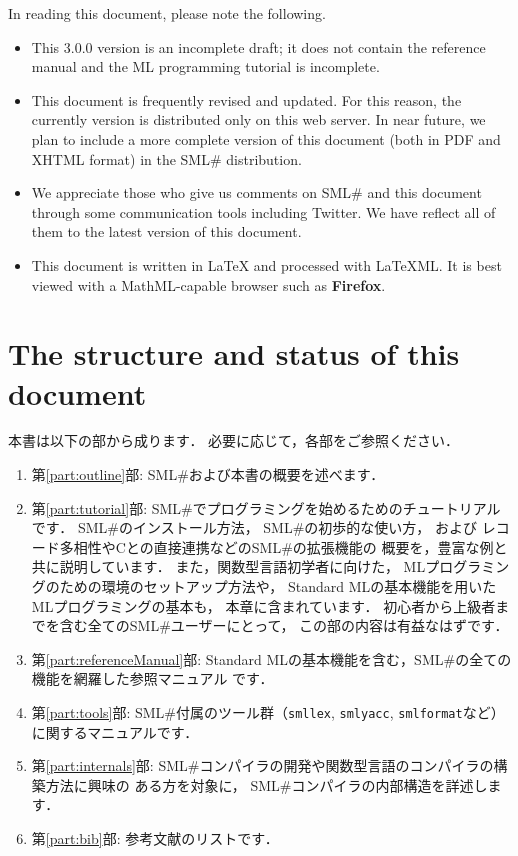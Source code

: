 \documentclass{jbook}
\newcommand{\txt}[2]{#2}
\newcommand{\smlsharp}{SML\#}
\newcommand{\version}{3.0.0}
\begin{document}
In reading this document, please note the following.
\begin{itemize}
\item 
	This \version{} version is an incomplete draft; it does not
contain the reference manual and the ML programming tutorial is
incomplete.

\item 
	This document is frequently revised and updated.
	For this reason, the currently version is distributed only on
this web server.
	In near future, we plan to include a more complete version of
this document (both in PDF and XHTML format) in the \smlsharp{}
distribution.

\item
	We appreciate those who give us comments on \smlsharp{} and
this document through some communication tools including Twitter.
	We have reflect all of them to the latest version of this
document.

\item 
	This document is written in LaTeX and processed with LaTeXML.
	It is best viewed with a MathML-capable browser such as {\bf Firefox}.
\end{itemize}
\fi%

\chapter{\txt{本書の構成と執筆状況}{The structure and status of this document}}

	本書は以下の部から成ります．
	必要に応じて，各部をご参照ください．
\begin{enumerate}
\item
	第\ref{part:outline}部: \smlsharp{}および本書の概要を述べます．
\item
	第\ref{part:tutorial}部:
\smlsharp{}でプログラミングを始めるためのチュートリアルです．
	\smlsharp{}のインストール方法，
\smlsharp{}の初歩的な使い方，
および
レコード多相性やCとの直接連携などの\smlsharp{}の拡張機能の
概要を，豊富な例と共に説明しています．
	また，関数型言語初学者に向けた，
MLプログラミングのための環境のセットアップ方法や，
Standard MLの基本機能を用いたMLプログラミングの基本も，
本章に含まれています．
	初心者から上級者までを含む全ての\smlsharp{}ユーザーにとって，
この部の内容は有益なはずです．
\item
	第\ref{part:referenceManual}部:
Standard MLの基本機能を含む，\smlsharp{}の全ての機能を網羅した参照マニュアル
です．
\item
	第\ref{part:tools}部:
\smlsharp{}付属のツール群（{\tt smllex}, {\tt smlyacc}, {\tt smlformat}など）
に関するマニュアルです．
\item
	第\ref{part:internals}部:
\smlsharp{}コンパイラの開発や関数型言語のコンパイラの構築方法に興味の
ある方を対象に，
\smlsharp{}コンパイラの内部構造を詳述します．
\item
	第\ref{part:bib}部: 参考文献のリストです．
\end{enumerate}
\end{document}
